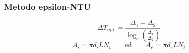 \documentclass[a4paper,10pt]{article}                                                                                       %
\begin{document}
\subsubsection{Metodo epsilon-NTU}                                                                                          %
\label{subsubsec:ecf_epsilon_nut}                                                                                           %
\vspace{1mm}                                                                                                                %
\begin{equation}                                                                                                            %
  \Delta{T_{m.l.}} = \frac{\Delta_{1}-\Delta_{2}}{\log_e{\left(\frac{\Delta_{1}}{\Delta_{2}}\right)}}                       %
  \label{eqn:deltatml}                                                                                                      %
\end{equation}                                                                                                              %
\vspace{3mm}                                                                                                                %
\begin{equation}                                                                                                            %
  A_i = \pi d_iLN_t                                                                                                         %
  \qquad\text{ed}\qquad                                                                                                     %
  A_e = \pi d_eLN_t                                                                                                         %
  \label{eqn:surf}                                                                                                          %
\end{equation}                                                                                                              %
\vspace{3mm}                                                                                                                %
\end{document}
